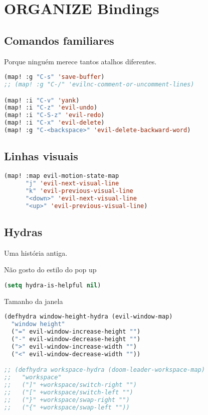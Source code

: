 \documentclass[11pt]{article}
\begin{document}
\section{ORGANIZE Bindings}
\label{sec:organize-bindings}


\subsection{Comandos familiares}
\label{sec:comandos-familiares}
Porque ninguém merece tantos atalhos diferentes.

\begin{lstlisting}[language=Lisp]
(map! :g "C-s" 'save-buffer)
;; (map! :g "C-/" 'evilnc-comment-or-uncomment-lines)

(map! :i "C-v" 'yank)
(map! :i "C-z" 'evil-undo)
(map! :i "C-S-z" 'evil-redo)
(map! :i "C-x" 'evil-delete)
(map! :g "C-<backspace>" 'evil-delete-backward-word)
\end{lstlisting}

\subsection{Linhas visuais}
\label{sec:linhas-visuais}
\begin{lstlisting}[language=Lisp]
(map! :map evil-motion-state-map
      "j" 'evil-next-visual-line
      "k" 'evil-previous-visual-line
      "<down>" 'evil-next-visual-line
      "<up>" 'evil-previous-visual-line)
\end{lstlisting}

\subsection{Hydras}
\label{sec:hydras}
Uma história antiga.

Não gosto do estilo do pop up

\begin{lstlisting}[language=Lisp]
(setq hydra-is-helpful nil)
\end{lstlisting}

Tamanho da janela

\begin{lstlisting}[language=Lisp]
(defhydra window-height-hydra (evil-window-map)
  "window height"
  ("=" evil-window-increase-height "")
  ("-" evil-window-decrease-height "")
  (">" evil-window-increase-width "")
  ("<" evil-window-decrease-width ""))

;; (defhydra workspace-hydra (doom-leader-workspace-map)
;;   "workspace"
;;   ("]" +workspace/switch-right "")
;;   ("[" +workspace/switch-left "")
;;   ("}" +workspace/swap-right "")
;;   ("{" +workspace/swap-left ""))
\end{lstlisting}
\end{document}
